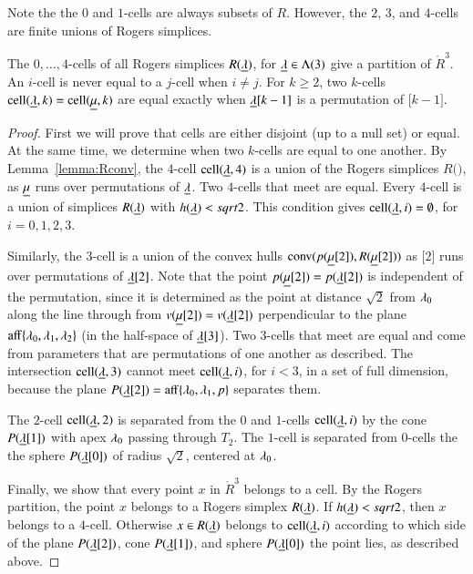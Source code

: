 Note the the $0$ and $1$-cells are always subsets of $R$.  However, the $2$, $3$, and
$4$-cells are finite unions of Rogers simplices.

\begin{lemma}  The $0,\ldots,4$-cells of all Rogers simplices $R({\underline{\lambda}})$, for ${\underline{\lambda}}\in \Lambda(3)$
give a partition of $\ring{R}^3$.  An $i$-cell is never equal to a $j$-cell when $i\ne j$. For $k\ge 2$, 
two $k$-cells $\operatorname{cell}({\underline{\lambda}},k)=\operatorname{cell}({\underline{\mu}},k)$ are equal exactly when ${\underline{\lambda}}[k-1]$
is a permutation of $\bm[k-1]$.
\end{lemma}

\begin{proof}  First we will prove that cells are either disjoint (up to a null set) or equal.  At the same
time, we determine when two $k$-cells are equal to one another.
By Lemma~\ref{lemma:Rconv}, the $4$-cell $\operatorname{cell}({\underline{\lambda}},4)$ is a union of the Rogers simplices
$R(\bm)$, as ${\underline{\mu}}$ runs over permutations of ${\underline{\lambda}}$. 
 Two $4$-cells
that meet are equal. 
Every $4$-cell is a union of simplices
$R({\underline{\lambda}})$ with $h({\underline{\lambda}})<sqrt2$.  This condition gives $\operatorname{cell}({\underline{\lambda}},i)=\emptyset$, for $i=0,1,2,3$.

Similarly, the $3$-cell is a union
of the convex hulls ${\operatorname{conv}}(p({\underline{\mu}}[2]),R({\underline{\mu}}[2]))$ as $\bm[2]$ runs over permutations of ${\underline{\lambda}}[2]$.  Note that the point $p({\underline{\mu}}[2])=p({\underline{\lambda}}[2])$ is independent of the permutation, since
it is determined as the point at distance $\sqrt2$ from $\lambda_0$ along the line through
from $v({\underline{\mu}}[2])=v({\underline{\lambda}}[2])$ perpendicular to the plane ${\operatorname{aff}}\{\lambda_0,\lambda_1,\lambda_2\}$
(in the half-space of ${\underline{\lambda}}[3]$). Two $3$-cells that meet are equal and come from parameters that are permutations of
one another as described.   The intersection $\operatorname{cell}({\underline{\lambda}},3)$ cannot meet $\operatorname{cell}({\underline{\lambda}},i)$, for $i<3$, in
a set of full dimension, because the plane $P({\underline{\lambda}}[2])={\operatorname{aff}}\{\lambda_0,\lambda_1,p\}$ separates them.

The $2$-cell $\operatorname{cell}({\underline{\lambda}},2)$ is separated from the $0$ and $1$-cells $\operatorname{cell}({\underline{\lambda}},i)$
by the cone $P({\underline{\lambda}}[1])$ with apex $\lambda_0$
passing through $T_2$. The $1$-cell is separated from $0$-cells the the sphere $P({\underline{\lambda}}[0])$
of radius
$\sqrt2$, centered at $\lambda_0$.

Finally, we show that every point $x$ in $\ring{R}^3$ belongs to a cell.  By the Rogers
partition, the point $x$ belongs to a Rogers simplex $R({\underline{\lambda}})$.  If $h({\underline{\lambda}})<sqrt2$, then
$x$ belongs to a $4$-cell.  Otherwise $x\in R({\underline{\lambda}})$ belongs to $\operatorname{cell}({\underline{\lambda}},i)$ according to
which side of the plane $P({\underline{\lambda}}[2])$, cone $P({\underline{\lambda}}[1])$, and sphere $P({\underline{\lambda}}[0])$ the point
lies, as described above.
\end{proof}


